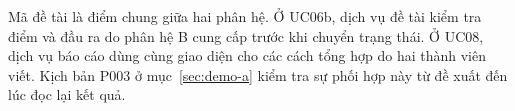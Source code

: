 Mã đề tài là điểm chung giữa hai phân hệ. Ở UC06b, dịch vụ đề tài kiểm tra điểm và đầu ra do phân hệ B cung cấp trước khi chuyển trạng thái. Ở UC08, dịch vụ báo cáo dùng cùng giao diện cho các cách tổng hợp do hai thành viên viết. Kịch bản P003 ở mục~\ref{sec:demo-a} kiểm tra sự phối hợp này từ đề xuất đến lúc đọc lại kết quả.
